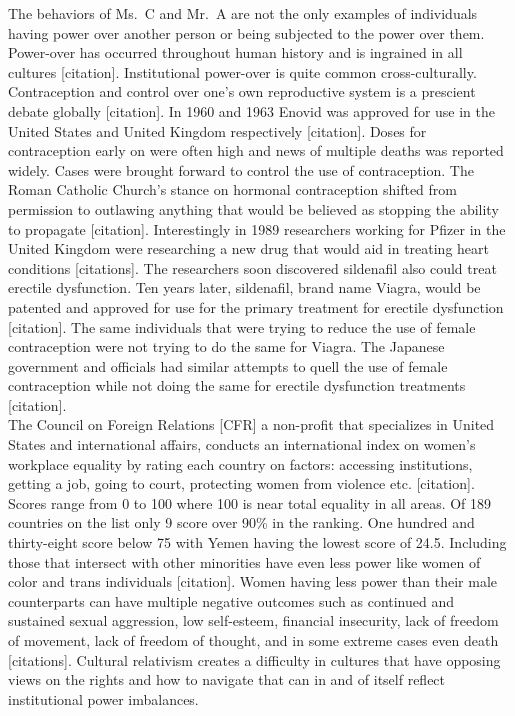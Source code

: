 \documentclass[
  donotrepeattitle,doc, 12pt, a4paper,floatsintext]{apa7}
\begin{document}
The behaviors of Ms.~C and Mr.~A are not the only examples of individuals having power over another person or being subjected to the power over them. Power-over has occurred throughout human history and is ingrained in all cultures {[}citation{]}. Institutional power-over is quite common cross-culturally. Contraception and control over one's own reproductive system is a prescient debate globally {[}citation{]}. In 1960 and 1963 Enovid was approved for use in the United States and United Kingdom respectively {[}citation{]}. Doses for contraception early on were often high and news of multiple deaths was reported widely. Cases were brought forward to control the use of contraception. The Roman Catholic Church's stance on hormonal contraception shifted from permission to outlawing anything that would be believed as stopping the ability to propagate {[}citation{]}. Interestingly in 1989 researchers working for Pfizer in the United Kingdom were researching a new drug that would aid in treating heart conditions {[}citations{]}. The researchers soon discovered sildenafil also could treat erectile dysfunction. Ten years later, sildenafil, brand name Viagra, would be patented and approved for use for the primary treatment for erectile dysfunction {[}citation{]}. The same individuals that were trying to reduce the use of female contraception were not trying to do the same for Viagra. The Japanese government and officials had similar attempts to quell the use of female contraception while not doing the same for erectile dysfunction treatments {[}citation{]}.\\
The Council on Foreign Relations {[}CFR{]} a non-profit that specializes in United States and international affairs, conducts an international index on women's workplace equality by rating each country on factors: accessing institutions, getting a job, going to court, protecting women from violence etc. {[}citation{]}. Scores range from 0 to 100 where 100 is near total equality in all areas. Of 189 countries on the list only 9 score over 90\% in the ranking. One hundred and thirty-eight score below 75 with Yemen having the lowest score of 24.5. Including those that intersect with other minorities have even less power like women of color and trans individuals {[}citation{]}. Women having less power than their male counterparts can have multiple negative outcomes such as continued and sustained sexual aggression, low self-esteem, financial insecurity, lack of freedom of movement, lack of freedom of thought, and in some extreme cases even death {[}citations{]}. Cultural relativism creates a difficulty in cultures that have opposing views on the rights and how to navigate that can in and of itself reflect institutional power imbalances.
\end{document}
